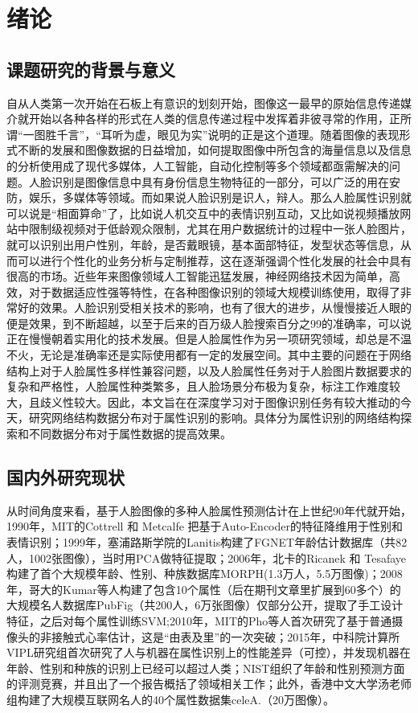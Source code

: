 \chapter{绪论}
\section{课题研究的背景与意义}
自从人类第一次开始在石板上有意识的划刻开始，图像这一最早的原始信息传递媒介就开始以各种各样的形式在人类的信息传递过程中发挥着非彼寻常的作用，正所谓“一图胜千言”，“耳听为虚，眼见为实”说明的正是这个道理。随着图像的表现形式不断的发展和图像数据的日益增加，如何提取图像中所包含的海量信息以及信息的分析使用成了现代多媒体，人工智能，自动化控制等多个领域都亟需解决的问题。人脸识别是图像信息中具有身份信息生物特征的一部分，可以广泛的用在安防，娱乐，多媒体等领域。而如果说人脸识别是识人，辩人。那么人脸属性识别就可以说是“相面算命”了，比如说人机交互中的表情识别互动，又比如说视频播放网站中限制级视频对于低龄观众限制，尤其在用户数据统计的过程中一张人脸图片，就可以识别出用户性别，年龄，是否戴眼镜，基本面部特征，发型状态等信息，从而可以进行个性化的业务分析与定制推荐，这在逐渐强调个性化发展的社会中具有很高的市场。近些年来图像领域人工智能迅猛发展，神经网络技术因为简单，高效，对于数据适应性强等特性，在各种图像识别的领域大规模训练使用，取得了非常好的效果。人脸识别受相关技术的影响，也有了很大的进步，从慢慢接近人眼的便是效果，到不断超越，以至于后来的百万级人脸搜索百分之99的准确率，可以说正在慢慢朝着实用化的技术发展。但是人脸属性作为另一项研究领域，却总是不温不火，无论是准确率还是实际使用都有一定的发展空间。其中主要的问题在于网络结构上对于人脸属性多样性兼容问题，以及人脸属性任务对于人脸图片数据要求的复杂和严格性，人脸属性种类繁多，且人脸场景分布极为复杂，标注工作难度较大，且歧义性较大。因此，本文旨在在深度学习对于图像识别任务有较大推动的今天，研究网络结构数据分布对于属性识别的影响。具体分为属性识别的网络结构探索和不同数据分布对于属性数据的提高效果。
\section{国内外研究现状}
从时间角度来看，基于人脸图像的多种人脸属性预测估计在上世纪90年代就开始，1990年，MIT的Cottrell 和 Metcalfe 把基于Auto-Encoder的特征降维用于性别和表情识别；1999年，塞浦路斯学院的Lanitis构建了FGNET年龄估计数据库（共82人，1002张图像），当时用PCA做特征提取；2006年，北卡的Ricanek 和 Tesafaye构建了首个大规模年龄、性别、种族数据库MORPH(1.3万人，5.5万图像)；2008年，哥大的Kumar等人构建了包含10个属性（后在期刊文章里扩展到60多个）的大规模名人数据库PubFig（共200人，6万张图像）仅部分公开，提取了手工设计特征，之后对每个属性训练SVM;2010年，MIT的Pho等人首次研究了基于普通摄像头的非接触式心率估计，这是“由表及里”的一次突破；2015年，中科院计算所VIPL研究组首次研究了人与机器在属性识别上的性能差异（可控），并发现机器在年龄、性别和种族的识别上已经可以超过人类；NIST组织了年龄和性别预测方面的评测竞赛，并且出了一个报告概括了领域相关工作；此外，香港中文大学汤老师组构建了大规模互联网名人的40个属性数据集celeA.（20万图像）。

